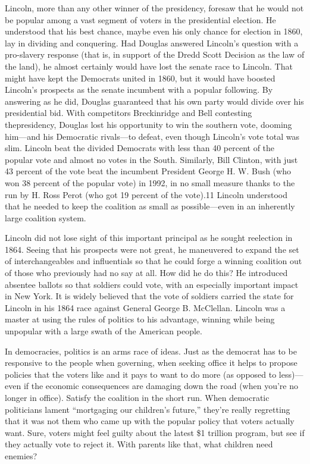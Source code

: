 \documentclass[10pt]{article}
\begin{document}
{\large Lincoln, more than any other winner of the presidency, foresaw that he
would not be popular among a vast segment of voters in the presidential election.
He understood that his best chance, maybe even his only chance for election in
1860, lay in dividing and conquering. Had Douglas answered Lincoln's question
with a pro-slavery response (that is, in support of the Dredd Scott Decision as
the law of the land), he almost certainly would have lost the senate race to
Lincoln. That might have kept the Democrats united in 1860, but it would have
boosted Lincoln's prospects as the senate incumbent with a popular following. By
answering as he did, Douglas guaranteed that his own party would divide over his
presidential bid. With competitors Breckinridge and Bell contesting
thepresidency, Douglas lost his opportunity to win the southern vote, dooming
him---and his Democratic rivals---to defeat, even though Lincoln's vote total was
slim. Lincoln beat the divided Democrats with less than 40 percent of the popular
vote and almost no votes in the South. Similarly, Bill Clinton, with just 43
percent of the vote beat the incumbent President George H. W. Bush (who won 38
percent of the popular vote) in 1992, in no small measure thanks to the run by H.
Ross Perot (who got 19 percent of the vote).11 Lincoln understood that he needed
to keep the coalition as small as possible---even in an inherently large
coalition system.}

{\large Lincoln did not lose sight of this important principal as he sought
reelection in 1864. Seeing that his prospects were not great, he maneuvered to
expand the set of interchangeables and influentials so that he could forge a
winning coalition out of those who previously had no say at all. How did he do
this? He introduced absentee ballots so that soldiers could vote, with an
especially important impact in New York. It is widely believed that the vote of
soldiers carried the state for Lincoln in his 1864 race against General George B.
McClellan. Lincoln was a master at using the rules of politics to his advantage,
winning while being unpopular with a large swath of the American people.}

{\large In democracies, politics is an arms race of ideas. Just as the democrat
has to be responsive to the people when governing, when seeking office it helps
to propose policies that the voters like and it pays to want to do more (as
opposed to less)---even if the economic consequences are damaging down the road
(when you're no longer in office). Satisfy the coalition in the short run. When
democratic politicians lament ``mortgaging our children's future,'' they're
really regretting that it was not them who came up with the popular policy that
voters actually want. Sure, voters might feel guilty about the latest \$1
trillion program, but see if they actually vote to reject it. With parents like
that, what children need enemies?}
\end{document}
